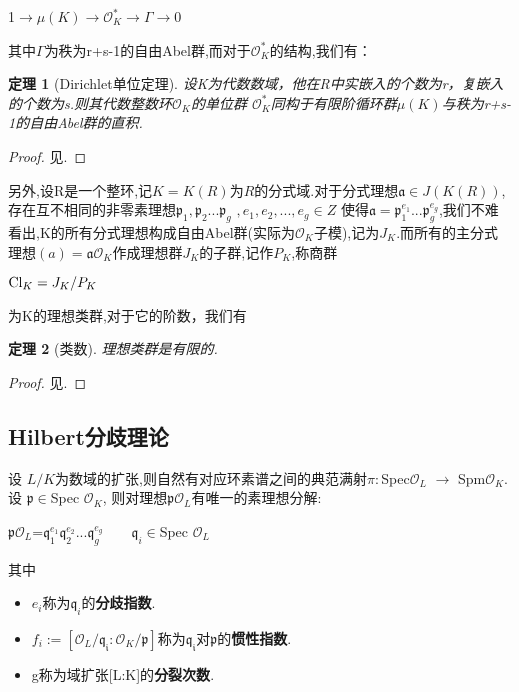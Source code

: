 \documentclass[11pt]{ctexart}
\newtheorem{thm}{定理}[section]
\begin{document}
\begin{center}
    1$\rightarrow \mu(K) \rightarrow \mathcal{O}_K^{*} \rightarrow \varGamma \rightarrow 0$
\end{center}
\noindent 其中$\varGamma$为秩为r+s-1的自由Abel群,而对于$\mathcal{O}_K^{*} $的结构,我们有：
\begin{thm}[Dirichlet单位定理]\label{Dirichlet}设K为代数数域，他在R中实嵌入的个数为r，复嵌入的个数为s.则其代数整数环$ \mathcal{O}_K $的单位群 $\mathcal{O}_K^{*} $同构于有限阶循环群$\mu(K)$与秩为r+s-1的自由Abel群的直积.
 
\end{thm}
\begin{proof}
    见\cite{ant}.
\end{proof}
另外,设R是一个整环,记$K=K(R)$为$ R $的分式域.对于分式理想$\mathfrak{a} \in J(K(R))$, 存在互不相同的非零素理想$\mathfrak{p}_1,\mathfrak{p}_2...\mathfrak{p}_g$ $,e_1,e_2, . . . , e_g\in Z$ 使得$\mathfrak{a}=\mathfrak{p}_1^{e_1}...\mathfrak{p}_g^{e_g}$,我们不难看出,K的所有分式理想构成自由Abel群(实际为$\mathcal{O}_K$子模),记为$J_K$.而所有的主分式理想$(a)=\mathfrak{a}\mathcal{O}_K$作成理想群$J_K$的子群,记作$P_K$,称商群

\begin{center}
    $\textup{Cl}_K=J_K/P_K$
\end{center}
\noindent 为K的理想类群,对于它的阶数，我们有
\begin{thm}[类数]
理想类群是有限的.
\end{thm}
\begin{proof}
    见\cite{ant}.
\end{proof}

\subsection{Hilbert分歧理论}

设 $L/K $为数域的扩张,则自然有对应环素谱之间的典范满射$π:$Spec$\mathcal{O}_L$ $\rightarrow $ Spm$\mathcal{O}_K$. 设
$\mathfrak{p} \in $Spec $\mathcal{O}_K$, 则对理想$\mathfrak{p}\mathcal{O}_L$有唯一的素理想分解:
\begin{center}
$\mathfrak{p}\mathcal{O}_L$=$\mathfrak{q}_1^{e_1} \mathfrak{q}_2^{e_2}...\mathfrak{q}_g^{e_g}$~~~~$\mathfrak{q}_i \in $Spec $\mathcal{O}_L$
\end{center}
\noindent 其中
\begin{itemize}
    \item $e_i$称为$\mathfrak{q}_i$的\textbf{分歧指数}.
    \item $f_i:=[\mathcal{O}_L/\mathfrak{q_i}:\mathcal{O}_K/\mathfrak{p}]$称为$\mathfrak{q_i}$对$\mathfrak{p}$的\textbf{惯性指数}.
    \item g称为域扩张[L:K]的\textbf{分裂次数}.
\end{itemize}
\end{document}

